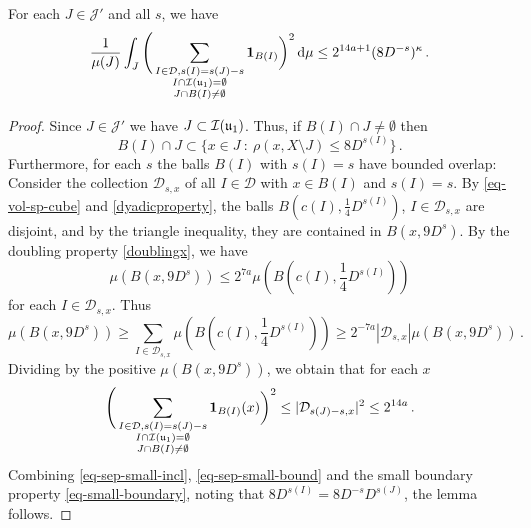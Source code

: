     \begin{lemma}
        \label{square-function-count}
        \leanok
        For each $J \in \mathcal{J}'$ and all $s$, we have
        $$
            \frac{1}{\mu(J)} \int_J \Bigg(\sum_{\substack{I \in \mathcal{D}, s(I) = s(J) - s\\ I \cap {\mathcal{I}}({\mathfrak u}_1) = \emptyset\\
        J \cap B(I) \ne \emptyset}} \mathbf{1}_{B(I)}\bigg)^2 \, \mathrm{d}\mu \le 2^{14a+1} (8 D^{-s})^\kappa\,.
        $$
    \end{lemma}

    \begin{proof}
        \leanok
        Since $J \in \mathcal{J}'$ we have $J \subset {\mathcal{I}}({\mathfrak u}_1)$. Thus, if $B(I) \cap J \ne \emptyset$ then
    \begin{equation}
        \label{eq-sep-small-incl}
        B(I) \cap J \subset \{x \in J \ : \ \rho(x, X \setminus J) \le 8D^{s(I)}\}\,.
    \end{equation}
    Furthermore, for each $s$ the balls $B(I)$ with $s(I) = s$ have bounded overlap: Consider the collection $\mathcal{D}_{s,x}$ of all $I \in \mathcal{D}$ with $x \in B(I)$ and $s(I) = s$. By \eqref{eq-vol-sp-cube} and \eqref{dyadicproperty}, the balls $B(c(I), \frac{1}{4} D^{s(I)})$, $I \in \mathcal{D}_{s,x}$ are disjoint, and by the triangle inequality, they are contained in $B(x, 9 D^{s})$. By the doubling property \eqref{doublingx}, we have
    $$
        \mu(B(x, 9D^{s})) \le 2^{7a} \mu(B(c(I), \frac{1}{4} D^{s(I)}))
    $$
    for each $I \in \mathcal{D}_{s,x}$.
    Thus
    $$
        \mu(B(x, 9D^{s})) \ge \sum_{I \in \mathcal{D}_{s,x}} \mu(B(c(I), \frac{1}{4} D^{s(I)})) \ge 2^{-7a} |\mathcal{D}_{s,x}| \mu(B(x, 9D^{s}))\,.
    $$
    Dividing by the positive $\mu(B(x, 9D^{s}))$, we obtain that for each $x$
    \begin{equation}
        \label{eq-sep-small-bound}
        \Bigg(\sum_{\substack{I \in \mathcal{D}, s(I) = s(J) - s\\ I \cap {\mathcal{I}}({\mathfrak u}_1) = \emptyset\\
        J \cap B(I) \ne \emptyset}} \mathbf{1}_{B(I)}(x) \bigg)^2 \le |\mathcal{D}_{s(J) - s,x}|^2 \le 2^{14a} \,.
    \end{equation}
    Combining \eqref{eq-sep-small-incl}, \eqref{eq-sep-small-bound} and the small boundary property \eqref{eq-small-boundary}, noting that $8D^{s(I)}=8D^{-s}D^{s(J)}$, the lemma follows.
\end{proof}


